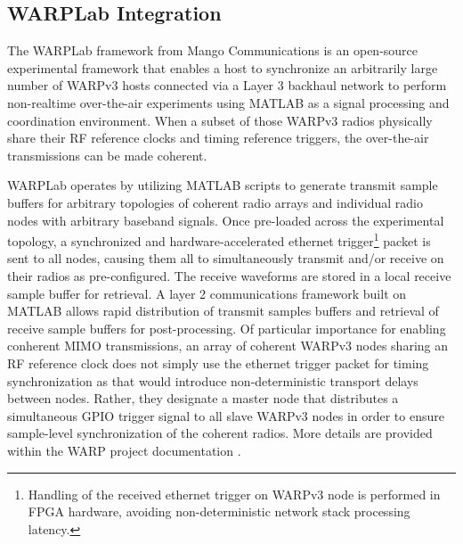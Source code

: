 

%

\subsection{WARPLab Integration}
\label{sec_warplab}

	The WARPLab framework from Mango Communications is an open-source experimental framework that enables a host to synchronize an arbitrarily large number of WARPv3 hosts connected via a Layer 3 backhaul network to perform non-realtime over-the-air experiments \cite{warplab} using MATLAB as a signal processing and coordination environment.
	When a subset of those WARPv3 radios physically share their RF reference clocks and timing reference triggers, the over-the-air transmissions can be made coherent.
	
	WARPLab operates by utilizing MATLAB scripts to generate transmit sample buffers for arbitrary topologies of coherent radio arrays and individual radio nodes with arbitrary baseband signals.
	Once pre-loaded across the experimental topology, a synchronized and hardware-accelerated ethernet trigger\footnote{Handling of the received ethernet trigger on WARPv3 node is performed in \ac{FPGA} hardware, avoiding non-deterministic network stack processing latency.} packet is sent to all nodes, causing them all to simultaneously transmit and/or receive on their radios as pre-configured.
	The receive waveforms are stored in a local receive sample buffer for retrieval.
	A layer 2 communications framework built on MATLAB allows rapid distribution of transmit samples buffers and retrieval of receive sample buffers for post-processing. 
	Of particular importance for enabling conherent \ac{MIMO} transmissions, an array of coherent WARPv3 nodes sharing an RF reference clock does not simply use the ethernet trigger packet for timing synchronization as that would introduce non-deterministic transport delays between nodes.
	Rather, they designate a master node that distributes a simultaneous \ac{GPIO} trigger signal to all slave WARPv3 nodes in order to ensure sample-level synchronization of the coherent radios.
	More details are provided within the WARP project documentation \cite{warplab}.
	

